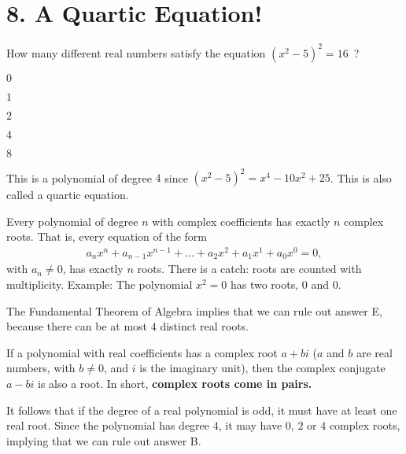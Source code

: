 \documentclass[12pt]{article}
\begin{document}
\section*{8. A Quartic Equation!}
\begin{question}
How many different real numbers satisfy the equation $(x^2-5)^2=16$~?
\begin{enumerate*}
  \item $0$
  \item $1$
  \item $2$
  \item $4$
  \item $8$
\end{enumerate*}
\end{question}
This is a polynomial of degree $4$ since $(x^2-5)^2=x^4-10x^2+25$. This is also called a quartic equation. 
\begin{theorem*}
Every polynomial of degree $n$ with complex coefficients has exactly $n$ complex roots. That is, every equation of the form
\begin{align*}
a_{n}x^{n} + a_{n-1}x^{n-1} + \ldots + a_{2}x^{2} + a_{1}x^{1} + a_{0}x^{0}
= 0,
\end{align*}
with $a_{n}\neq 0$, has exactly $n$ roots. There is a catch: roots are counted with multiplicity. Example: The polynomial $x^2=0$ has two roots, $0$ and $0$. 
\end{theorem*}
The Fundamental Theorem of Algebra implies that we can rule out answer E, because there can be at most $4$ distinct real roots. 
\begin{theorem*}
If a polynomial with real coefficients has a complex root $a+bi$ ($a$ and $b$ are real numbers, with $b\neq0$, and $i$ is the imaginary unit), then the complex conjugate $a-bi$ is also a root. In short, \textbf{complex roots come in pairs.}
\end{theorem*}
It follows that if the degree of a real polynomial is odd, it must have at least one real root. Since the polynomial has degree $4$, it may have $0$, $2$ or $4$ complex roots, implying that we can rule out answer B. 
\end{document}
